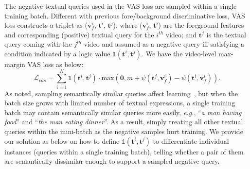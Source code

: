 The negative textual queries used in the VAS loss 
are sampled within
a single training batch.
Different with previous fore/background discriminative loss, 
VAS loss constructs a triplet as ($\boldsymbol{v}_f^i$, 
$\boldsymbol{t}^i$,
$\boldsymbol{t}^j$), 
where ($\boldsymbol{v}_f^i$, $\boldsymbol{t}^i$) are the foreground
features and corresponding (positive) textual query for the $i^{th}$ video;
and $\boldsymbol{t}^j$ is the textual query coming with the $j^{th}$ video and assumed as a negative query iff satisfying 
a condition indicated by a logic value 
${\mathbb{1}}(\boldsymbol{t}^i, \boldsymbol{t}^j)$.
We have the video-level max-margin VAS loss as below:
\begin{equation}
    \mathcal{L}_{vas} = \sum_{i=1}^{N}{\mathbb{1}}(\boldsymbol{t}^i, \boldsymbol{t}^j) \cdot 
    \text{max}(\textbf{0}, m + \psi(\boldsymbol{t}^j, \boldsymbol{v}_f^i) - \psi(\boldsymbol{t}^i, \boldsymbol{v}_f^i)).
\end{equation}
As noted, sampling semantically similar queries affect learning~\citep{wu2018unsupervised},
but when the batch size grows with limited number of textual expressions, 
a single training batch may contain semantically similar queries more 
easily,
\emph{e.g.}, ``\textit{a man having food}'' and ``\textit{the man eating dinner}''. 
As a result, 
simply treating all other textual queries within the mini-batch as the negative samples hurt training.
We provide our solution as below on how to define ${\mathbb{1}}(\boldsymbol{t}^i, \boldsymbol{t}^j)$
to differentiate individual instances (queries within a single
training batch),
telling whether a pair of them are semantically dissimilar enough
to support a sampled negative query.





